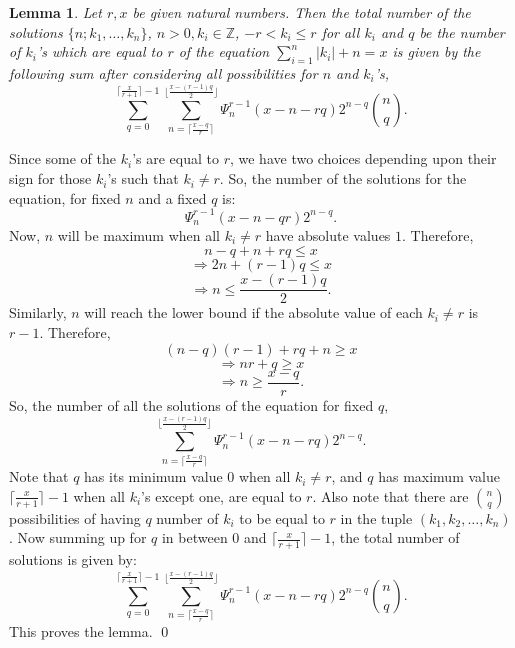 \documentclass[11pt]{amsart}
\renewenvironment{proof}{{\bfseries Proof.}}{\qed}
\numberwithin{equation}{section}
\newtheorem{lemma}[theorem]{Lemma}
\theoremstyle{definition}
\newcommand{\imp}{\Rightarrow}
\numberwithin{equation}{section}
\begin{document}
	\begin{lemma}\label{3.1}
		Let $r, x$ be given natural numbers. Then the total number of the solutions $\{n; k_1, \ldots, k_n\}$, $n>0, {k}_i \in \mathbb Z$, $-r<k_{i}\leq r$ for all $k_{i}$ and $q$ be the number of $k_{i}$'s which are equal to $r$ of the equation $\sum_{i=1}^{n}|k_{i}|+n=x$ is given by the following sum after considering all possibilities for $ n$ and $k_{i}$'s, 
		\[\sum_{q=0}^{\lceil\frac{x}{r+1}\rceil-1}\sum_{n=\lceil \frac{x-q}{r}\rceil}^{\lfloor \frac{x-(r-1)q}{2}\rfloor}\Psi_{n}^{r-1}(x-n-rq)2^{n-q} {n\choose q}.\]
	\end{lemma}
	\begin{proof}
		Since some of the $k_{i}$'s are equal to $r$, we have two choices depending upon their sign for those $k_{i}$'s such that $k_{i}\neq r$. So, the number of the solutions for the equation, for fixed $n$ and a fixed $q$ is:  
		\begin{equation}
			\Psi_{n}^{r-1}(x-n-qr)2^{n-q}.
		\end{equation}
		Now, $n$ will be maximum when all $k_{i} \neq r$ have absolute values $1$. Therefore,
		\[n-q+n+rq\leq x\]
		\[\imp 2n+(r-1)q\leq x\]
		\[\imp n\leq \frac{x-(r-1)q}{2}.\]
		Similarly, $n$ will reach the lower bound if the absolute value of each $k_{i} \neq r$ is $r-1$. Therefore,
		\[(n-q)(r-1)+rq+n\geq x\]
		\[\imp nr+q\geq x \]
		\[\imp n\geq \frac{x-q}{r}.\] So,  the number of all the solutions of the equation for fixed $q,$
		\[\sum_{n=\lceil \frac{x-q}{r}\rceil}^{\lfloor \frac{x-(r-1)q}{2}\rfloor}\Psi_{n}^{r-1}(x-n-rq)2^{n-q}.\]
		Note that 		$q$ has its minimum value $0$ when  all $k_i\neq r$, and $q$ has  maximum value $\lceil\frac{x}{r+1}\rceil-1$ when all $k_i$'s except one, are equal to $r$.   Also note that there are ${n\choose q}$ possibilities of having $q$ number of $k_i$ to be equal to $r$ in the tuple $(k_1,k_2,\dots ,k_n)$. 
		Now summing up for $q$ in between $0$ and $\lceil\frac{x}{r+1}\rceil-1$, the total number of solutions is given by: 
		\[\sum_{q=0}^{\lceil\frac{x}{r+1}\rceil-1}\sum_{n=\lceil \frac{x-q}{r}\rceil}^{\lfloor \frac{x-(r-1)q}{2}\rfloor}\Psi_{n}^{r-1}(x-n-rq)2^{n-q}{n\choose q}.\]
		This proves the lemma. 
	\end{proof}
	
\end{document}
